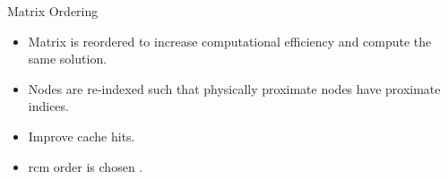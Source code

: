 \begin{frame}{Matrix Ordering}
  \begin{itemize}
    \item Matrix is reordered to increase computational efficiency and compute
      the same solution.
    \item Nodes are re-indexed such that physically proximate nodes have
      proximate indices.
    \item Improve cache hits.
    \item \gls{rcm} order is chosen \cite{rcm}.
  \end{itemize}
  \vspace{-0.25in}
  \begin{figure}
    \centering
    \hspace{0.1in}
    \label{fig:sparsity_pattern}
  \end{figure}
\end{frame}

